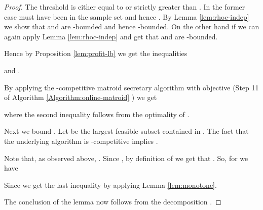 \begin{proof}
 The threshold  is either equal to or strictly greater than
 . In the former case  must have been in the sample
 set  and hence . By Lemma \ref{lem:rhoc-indep} we show that  and  are
 -bounded and hence -bounded. On the other hand if  we can again apply Lemma \ref{lem:rhoc-indep} and get that
  and  are -bounded.
 
Hence by Proposition \ref{lem:profit-lb} we get the inequalities

and .
  
  By applying the -competitive matroid secretary algorithm with
  objective  (Step 11 of Algorithm
  \ref{Algorithm:online-matroid} ) we get
  
\noindent where the second inequality follows from the optimality of . 

Next we bound . Let
 be the largest feasible subset contained in . The
fact that the underlying algorithm is -competitive implies
.

Note that, as observed above, . Since , by definition of  we get that . So, for  we have
  

\noindent Since  we get the last inequality by applying Lemma
\ref{lem:monotone}.

  The conclusion of the lemma now follows from the decomposition
  .
  \end{proof}


